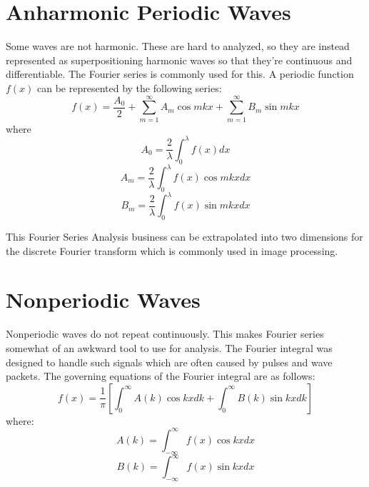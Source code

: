 \documentclass[12pt]{report}
\begin{document}
\section{Anharmonic Periodic Waves}
Some waves are not harmonic. These are hard to analyzed, so they are instead represented as superpositioning harmonic waves so that they're continuous and differentiable. The Fourier series is commonly used for this. A periodic function $f(x)$ can be represented by the following series:
\begin{equation}
f(x) = \frac{A_0}{2}+ \displaystyle\sum\limits_{m=1}^\infty A_m \cos mkx + \displaystyle\sum\limits_{m=1}^\infty B_m \sin mkx
\end{equation}
where
\begin{equation}
A_0 = \frac{2}{\lambda} \int_0^\lambda f(x)dx
\end{equation}
\begin{equation}
A_m = \frac{2}{\lambda}\int_0^\lambda f(x) \cos mkx dx
\end{equation}
\begin{equation}
B_m = \frac{2}{\lambda}\int_0^\lambda f(x) \sin mkx dx
\end{equation}

This Fourier Series Analysis business can be extrapolated into two dimensions for the discrete Fourier transform which is commonly used in image processing. 
\section{Nonperiodic Waves}
Nonperiodic waves do not repeat continuously. This makes Fourier series somewhat of an awkward tool to use for analysis. The Fourier integral was designed to handle such signals which are often caused by pulses and wave packets. The governing equations of the Fourier integral are as follows:
\begin{equation}
f(x) = \frac{1}{\pi} \left[ \int _0^\infty A(k) \cos kx dk + \int_0^\infty B(k) \sin kxdk \right]
\end{equation}
where:
\begin{equation}
A(k) = \int_{-\infty}^\infty f(x) \cos kxdx
\end{equation}
\begin{equation}
B(k) = \int_{-\infty}^\infty f(x) \sin kxdx
\end{equation}
\end{document}
